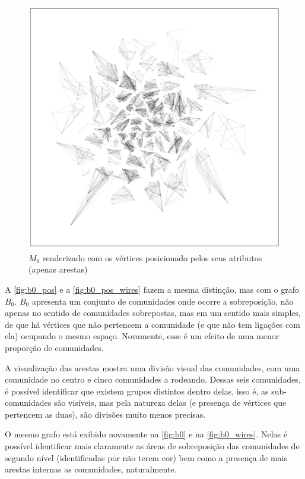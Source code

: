 \documentclass[notes.tex]{subfiles}
\begin{document}
\begin{figure}[htpb]
    \centering
    \caption{$M_0$ renderizado com os vértices posicionado pelos seus atributos (apenas arestas)}\label{fig:m0_pos_wires}
    \includegraphics[width=\textwidth, height=0.52\textheight]{figures/m0_pos_wires.png}
     \end{figure}

A \autoref{fig:b0_pos} e a \autoref{fig:b0_pos_wires} fazem a mesma distinção, mas com o grafo $B_0$.
$B_0$ apresenta um conjunto de comunidades onde ocorre a sobreposição, não apenas no sentido de comunidades sobrepostas, mas em um sentido mais simples, de que há vértices que não pertencem a comunidade (e que não tem ligações com ela) ocupando o mesmo espaço.
Novamente, esse é um efeito de uma menor proporção de comunidades.

A visualização das arestas mostra uma divisão visual das comunidades, com uma comunidade no centro e cinco comunidades a rodeando.
Dessas seis comunidades, é possível identificar que existem grupos distintos dentro delas, isso é, as sub-comunidades são visíveis, mas pela natureza delas (e presença de vértices que pertencem as duas), são divisões muito menos precisas.

O mesmo grafo está exibido novamente na \autoref{fig:b0} e na \autoref{fig:b0_wires}.
Nelas é possível identificar mais claramente as áreas de sobreposição das comunidades de segundo nível (identificadas por não terem cor) bem como a presença de mais arestas internas as comunidades, naturalmente.
\end{document}
